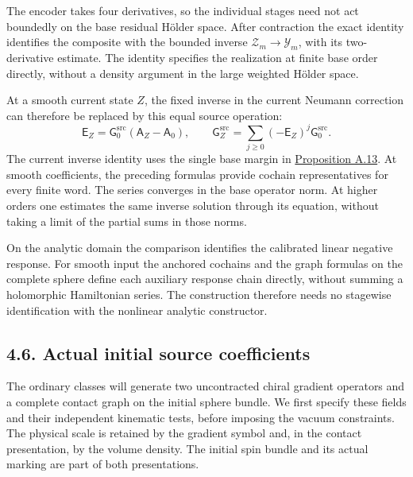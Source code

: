\documentclass[
  english,
  11pt,
  reqno]{amsart}
\begin{document}
The encoder takes four derivatives, so the individual stages need not
act boundedly on the base residual Hölder space. After contraction the
exact identity identifies the composite with the bounded inverse
\(\mathcal Z_m\to\mathcal Y_m\), with its two-derivative estimate. The
identity specifies the realization at finite base order directly,
without a density argument in the large weighted Hölder space.

At a smooth current state \(Z\), the fixed inverse in the current
Neumann correction can therefore be replaced by this equal source
operation:%
\[
\mathsf E_Z=\mathsf G_0^{\mathrm{src}}(\mathsf A_Z-\mathsf A_0),
\qquad
\mathsf G_Z^{\mathrm{src}}
=\sum_{j\ge0}(-\mathsf E_Z)^j\mathsf G_0^{\mathrm{src}}.
\] The current inverse identity uses the single base margin in
\hyperref[prop:online-current-inverse-horizontal-flatness]{Proposition
A.13}. At smooth coefficients, the preceding formulas provide cochain
representatives for every finite word. The series converges in the base
operator norm. At higher orders one estimates the same inverse solution
through its equation, without taking a limit of the partial sums in
those norms.

On the analytic domain the comparison identifies the calibrated linear negative response. For smooth input the anchored cochains and the graph formulas on the complete sphere define each auxiliary response chain directly, without summing a holomorphic Hamiltonian series. The construction therefore needs no stagewise identification with the nonlinear analytic constructor.

\subsection{4.6. Actual initial source
coefficients}\label{actual-initial-source-coefficients}\label{sec:online-actual-initial-source-carriers}

The ordinary classes will generate two uncontracted chiral gradient
operators and a complete contact graph on the initial sphere bundle. We
first specify these fields and their independent kinematic tests, before
imposing the vacuum constraints. The physical scale is retained by the
gradient symbol and, in the contact presentation, by the volume density.
The initial spin bundle and its actual marking are part of both
presentations.
\end{document}
